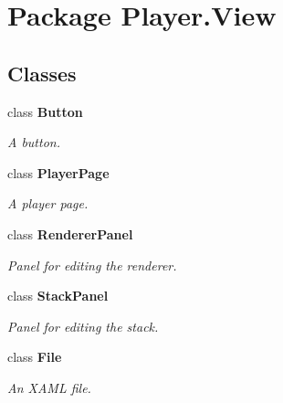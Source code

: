 \section{Package Player.\-View}
\label{namespace_player_1_1_view}
\subsection*{Classes}
\begin{DoxyCompactItemize}
\item 
class {\bf Button}
\begin{DoxyCompactList}\small\item\em A button. \end{DoxyCompactList}\item 
class {\bf Player\-Page}
\begin{DoxyCompactList}\small\item\em A player page. \end{DoxyCompactList}\item 
class {\bf Renderer\-Panel}
\begin{DoxyCompactList}\small\item\em Panel for editing the renderer. \end{DoxyCompactList}\item 
class {\bf Stack\-Panel}
\begin{DoxyCompactList}\small\item\em Panel for editing the stack. \end{DoxyCompactList}\item 
class {\bf File}
\begin{DoxyCompactList}\small\item\em An X\-A\-M\-L file. \end{DoxyCompactList}\end{DoxyCompactItemize}
